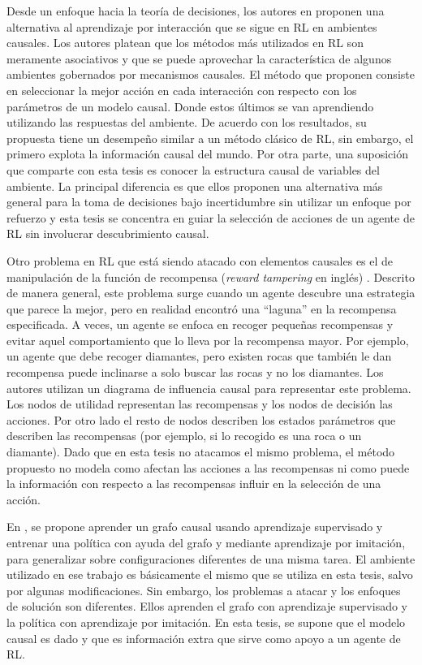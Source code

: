 Desde un enfoque hacia la teoría de decisiones, los autores en \cite{playingagainstnature2018, gonzalezsoto2019von} proponen una alternativa al aprendizaje por interacción que se sigue en RL en ambientes causales. Los autores platean que los métodos más utilizados en RL son meramente asociativos y que se puede aprovechar la característica de algunos ambientes gobernados por mecanismos causales. El método que proponen consiste en seleccionar la mejor acción 
	en cada interacción con respecto con los parámetros de un modelo causal. Donde estos últimos se van aprendiendo utilizando las respuestas del ambiente. De acuerdo con los resultados, su propuesta tiene un desempeño similar a un método clásico de RL, sin embargo, el primero explota la información causal del mundo. Por otra parte, una suposición que comparte con esta tesis es conocer la estructura causal de variables del ambiente. La principal diferencia es que ellos proponen una alternativa más general para la toma de decisiones bajo incertidumbre sin utilizar un enfoque por refuerzo y esta tesis se concentra en guiar la selección de acciones de un agente de RL sin involucrar descubrimiento causal.

Otro problema en RL que está siendo atacado con elementos causales es el de manipulación de la función de recompensa (\textit{reward tampering} en inglés) \cite{everitt2019reward}. Descrito de manera general, este problema surge cuando un agente descubre una estrategia que parece la mejor, pero en realidad encontró una ``laguna'' en la recompensa especificada. A veces, un agente se enfoca en recoger pequeñas recompensas y evitar aquel comportamiento que lo lleva por la recompensa mayor. Por ejemplo, un agente que debe recoger diamantes, pero existen rocas que también le dan recompensa puede inclinarse a solo buscar las rocas y no los diamantes. Los autores utilizan un diagrama de influencia causal para representar este problema. Los nodos de utilidad representan las recompensas y los nodos de decisión las acciones. Por otro lado el resto de nodos describen los estados parámetros que describen las recompensas (por ejemplo, si lo recogido es una roca o un diamante).
Dado que en esta tesis no atacamos el mismo problema, el método propuesto no modela como afectan las acciones a las recompensas ni como puede la información con respecto a las recompensas influir en la selección de una acción.

En \cite{nair2019causal}, se propone
aprender un grafo causal usando aprendizaje supervisado y
entrenar una política con ayuda del grafo y mediante aprendizaje por imitación, para generalizar sobre 
configuraciones diferentes de una misma
tarea.
El ambiente utilizado en ese trabajo es básicamente el mismo que se utiliza en esta
tesis, salvo por algunas modificaciones. Sin embargo, los problemas a atacar y los enfoques
de solución son diferentes. Ellos aprenden el grafo con aprendizaje supervisado y
la política con aprendizaje por imitación. En esta tesis, se supone que
el modelo causal es dado y que es información extra que sirve como apoyo a un agente de RL.


